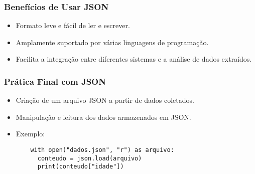 \documentclass{beamer}
\begin{document}
\begin{frame}
  \frametitle{Benefícios de Usar JSON}
  \begin{itemize}
    \item Formato leve e fácil de ler e escrever.
    \item Amplamente suportado por várias linguagens de programação.
    \item Facilita a integração entre diferentes sistemas e a análise de dados extraídos.
  \end{itemize}
\end{frame}

\begin{frame}[fragile]
  \frametitle{Prática Final com JSON}
  \begin{itemize}
    \item Criação de um arquivo JSON a partir de dados coletados.
    \item Manipulação e leitura dos dados armazenados em JSON.
    \item Exemplo:
    \begin{verbatim}
    with open("dados.json", "r") as arquivo:
      conteudo = json.load(arquivo)
      print(conteudo["idade"])
    \end{verbatim}
  \end{itemize}
\end{frame}
\end{document}
